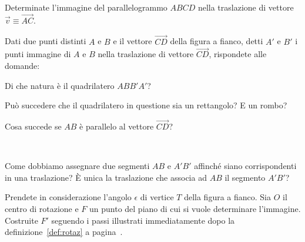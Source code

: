 \begin{esercizio}
\label{ese:8.45} %
Determinate l'immagine del parallelogrammo \(ABCD\) nella traslazione 
di vettore \(\vec{v} \equiv \overrightarrow{AC}\).
\end{esercizio}

\noindent\begin{minipage}{0.75\textwidth}\parindent15pt
\begin{esercizio}
\label{ese:8.46} %
Dati due punti distinti \(A\) e \(B\) e il vettore \(\overrightarrow{CD}\) 
della figura a fianco, detti \(A'\) e \(B'\) i punti immagine di \(A\) e 
\(B\) nella traslazione di vettore \(\overrightarrow{CD}\), rispondete 
alle domande:
\begin{enumeratea}
\item Di che natura è il quadrilatero \(ABB'A'\)?
\item Può succedere che il quadrilatero in questione sia un 
rettangolo? E un rombo?
\item Cosa succede se \(AB\) è parallelo al vettore 
\(\overrightarrow{CD}\)?
\end{enumeratea}
\end{esercizio}
\end{minipage}\hfil
\begin{minipage}{0.25\textwidth}
	\centering~~
\end{minipage}\vspace{8pt}

\begin{esercizio}
\label{ese:8.47} %
Come dobbiamo assegnare due segmenti \(AB\) e \(A'B'\) affinché siano 
corrispondenti in una traslazione? \`E unica la traslazione che 
associa ad \(AB\) il segmento \(A'B'\)?
\end{esercizio}

\begin{esercizio}
\label{ese:8.58} %
Prendete in considerazione l'angolo \(\epsilon\) di vertice \(T\) della 
figura a fianco. Sia \(O\) il centro di rotazione e \(F\) un punto del 
piano di cui si vuole determinare l'immagine. Costruite \(F'\) seguendo 
i passi illustrati immediatamente dopo la definizione~\ref{def:rotaz} 
a pagina~\pageref{def:rotaz}.
\end{esercizio}
\begin{minipage}{0.3\textwidth}
	\centering~~
\end{minipage}\vspace{8pt}

